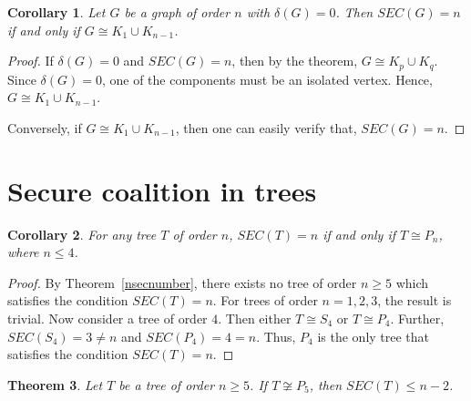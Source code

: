\documentclass[12pt]{article}
\newtheorem{theorem}{Theorem}[section]
\newtheorem{corollary}[theorem]{Corollary}
\begin{document}
\begin{corollary}
Let $G$ be a graph of order $n$ with $\delta(G)=0$. Then
$SEC(G)=n$ if and only if $G\cong K_1\cup K_{n-1}$.
\end{corollary}
\begin{proof}
If $\delta(G)=0$ and $SEC(G)=n$, then by the theorem,
$G\cong K_p\cup K_q$. Since $\delta(G)=0$, one of the components must be an isolated vertex. Hence, $G\cong K_1\cup K_{n-1}$.

Conversely, if $G\cong K_1\cup K_{n-1}$, then one can easily verify that, $SEC(G)=n$.
\end{proof}
\section{Secure coalition in trees}
\begin{corollary}\label{nsecnumber1}
For any tree $T$ of order $n$, $SEC(T)=n$ if and only if $T\cong P_n$, where $n\le 4$.
\end{corollary}
\begin{proof}
By Theorem~\ref{nsecnumber}, there exists no tree of order $n\ge 5$ which satisfies the condition $SEC(T)=n$. For trees of order $n=1,2,3$, the result is trivial. Now consider a tree of order $4$. Then either $T\cong S_4$ or $T\cong P_4$. Further, $SEC(S_4)=3\neq n$ and $SEC(P_4)=4=n$. Thus, $P_4$ is the only tree that satisfies the condition $SEC(T)=n$.
\end{proof}
\begin{theorem}\label{treen-2}
Let $T$ be a tree of order $n\ge 5$. If $T\not\cong P_5$, then
$SEC(T)\le n-2$.
\end{theorem}
\end{document}
